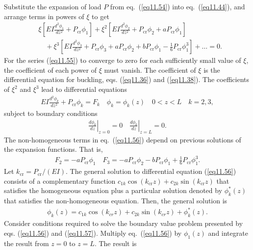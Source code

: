 \documentclass{AeroStructure-ERJohnson}
\begin{document}
Substitute the expansion of load $P$ from eq.~(\ref{eq11.54}) into eq.~(\ref{eq11.44}), and arrange terms in powers of $\xi$ to get
\begin{align}
&\xi\left[E I \frac{d^{2} \phi_{1}}{d z^{2}}+P_{\mathrm{cr}} \phi_{1}\right]+\xi^{2}\left[E I \frac{d^{2} \phi_{2}}{d z^{2}}+P_{\mathrm{cr}} \phi_{2}+a P_{\mathrm{cr}} \phi_{1}\right] \nonumber \\
&\quad +\xi^{3}\left[E I \frac{d^{2} \phi_{3}}{d z^{2}}+P_{\mathrm{cr}} \phi_{3}+a P_{\mathrm{cr}} \phi_{2}+b P_{\mathrm{cr}} \phi_{1}-\frac{1}{6} P_{\mathrm{cr}} \phi_{1}^{3}\right]+\ldots=0. \label{eq11.55}
\end{align}
For the series (\ref{eq11.55}) to converge to zero for each sufficiently small value of $\xi$, the coefficient of each power of $\xi$ must vanish. The coefficient of $\xi$ is the differential equation for buckling, eqs. (\ref{eq11.36}) and (\ref{eq11.38}). The coefficients of $\xi^{2}$ and $\xi^3$ lead to differential equations
\begin{align}\label{eq11.56}
E I \frac{d^{2} \phi_{k}}{d z^{2}}+P_{\mathrm{cr}} \phi_{k}=F_{k} \quad \phi_{k}=\phi_{k}(z) \quad 0<z<L \quad k=2,3,
\end{align}
subject to boundary conditions
\begin{align}\label{eq11.57}
\left.\frac{d\phi_{k}}{dz}\right|_{z=0}=\left.0 \quad \frac{d \phi_{k}}{d z}\right|_{z=L}=0.
\end{align}
The non-homogeneous terms in eq.~(\ref{eq11.56}) depend on previous solutions of the expansion functions. That is,
\begin{align}\label{eq11.58}
F_{2}=-a P_{\mathrm{cr}} \phi_{1} \quad F_{3}=-a P_{\mathrm{cr}} \phi_{2}-b P_{\mathrm{cr}} \phi_{1}+\frac{1}{6} P_{\mathrm{cr}} \phi_{1}^{3}.
\end{align}
Let $k_{\textrm{cr}}=P_{\textrm{cr}} /(E I)$. The general solution to differential equation (\ref{eq11.56}) consists of a complementary function $c_{1 k} \cos \left(k_{\textrm{cr}} z\right)+c_{2 k} \sin \left(k_{\textrm{cr}} z\right)$ that satisfies the homogeneous equation plus a particular solution denoted by $\phi_{k}^{*}(z)$ that satisfies the non-homogeneous equation. Then, the general solution is
\begin{align}\label{eq11.59}
\phi_{k}(z)=c_{1 k} \cos \left(k_{c r} z\right)+c_{2 k} \sin \left(k_{c r} z\right)+\phi_{k}^{*}(z).
\end{align}
Consider conditions required to solve the boundary value problem presented by eqs. (\ref{eq11.56}) and (\ref{eq11.57}). Multiply eq.~(\ref{eq11.56}) by $\phi_{1}(z)$ and integrate the result from $z=0$ to $z=L$. The result is
\end{document}
